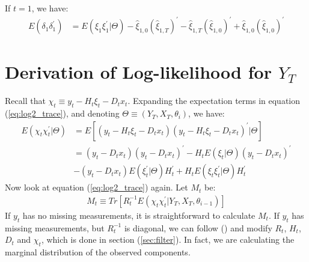 \documentclass[12pt]{article}
\numberwithin{equation}{section}
\begin{document}
If $t=1$, we have:
\begin{align*}
    E(\delta_1\delta_1^{'}) &= E(\xi_1\xi_1^{'}|\Theta) - \hat{\xi}_{1,0}(\hat{\xi}_{1,T})^{'}
    -\hat{\xi}_{1,T}(\hat{\xi}_{1,0})^{'} + \hat{\xi}_{1,0}(\hat{\xi}_{1,0})^{'}
\end{align*}

\section{Derivation of Log-likelihood for $Y_T$} \label{ap:log2}
Recall that $\chi_t \equiv y_t - H_t\xi_t - D_tx_t$. Expanding the expectation terms in equation (\ref{eq:log2_trace}), and denoting $\Theta \equiv (Y_T,X_T,\theta_i)$, we have:
\begin{align*}
    E(\chi_t\chi_t^{'}|\Theta) &= E[(y_t - H_t\xi_t - D_tx_t)(y_t - H_t\xi_t - D_tx_t)^{'}|\Theta] \\
    &= (y_t-D_tx_t)(y_t-D_tx_t)^{'} - H_tE(\xi_t|\Theta)(y_t-D_tx_t)^{'} \\
    &-(y_t-D_tx_t)E(\xi_t^{'}|\Theta)H_t^{'} + H_tE(\xi_t\xi_t^{'}|\Theta)H_t^{'}
\end{align*}
Now look at equation (\ref{eq:log2_trace}) again. Let $M_t$ be:
\begin{align*}
    M_t \equiv Tr[R_t^{-1}E(\chi_t\chi_t^{'}|Y_T,X_T,\theta_{i-1})] 
\end{align*}
If $y_t$ has no missing measurements, it is straightforward to calculate $M_t$. If $y_t$ has missing measurements, but $R_t^{-1}$ is diagonal, we can follow (\cite{shumway_stoffer_1982}) and modify $R_t$, $H_t$, $D_t$ and $\chi_t$, which is done in section (\ref{sec:filter}). In fact, we are calculating the marginal distribution of the observed components. 
\end{document}
